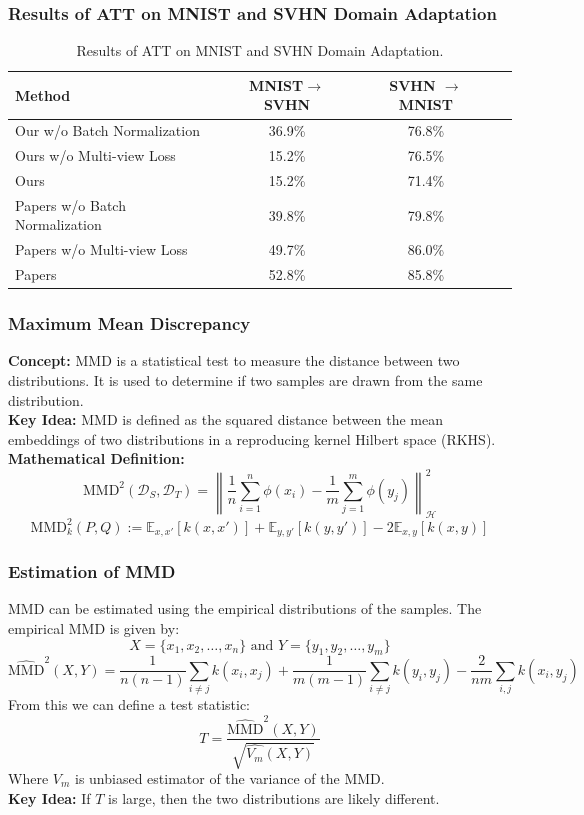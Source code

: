 \documentclass{beamer}
\begin{document}
\begin{frame}
    \frametitle{Results of ATT on MNIST and SVHN Domain Adaptation}

    \begin{table}[h]
        \centering
        \caption{Results of ATT on MNIST and SVHN Domain Adaptation.}
        \label{tab:att_results}
        \begin{tabular}{lccc}
            \toprule
            \textbf{Method} & \textbf{MNIST\(\to\)SVHN} & \textbf{SVHN \(\to\) MNIST} \\
            \midrule
            Our w/o Batch Normalization & 36.9\% & 76.8\% \\
            Ours w/o Multi-view Loss & 15.2\% & 76.5\% \\
            Ours  & 15.2\% & 71.4\% \\
            \midrule
            Papers w/o Batch Normalization & 39.8\% & 79.8\% \\
            Papers w/o Multi-view Loss & 49.7\% & 86.0\% \\
            Papers  & 52.8\% & 85.8\% \\
            \bottomrule
        \end{tabular}
      \end{table}
\end{frame}


\begin{frame}
    \frametitle{Maximum Mean Discrepancy}
    \textbf{Concept:} MMD is a statistical test to measure the distance between two distributions. It is used to determine if two samples are drawn from the same distribution.\\
    \textbf{Key Idea:} MMD is defined as the squared distance between the mean embeddings of two distributions in a reproducing kernel Hilbert space (RKHS).\\
    \textbf{Mathematical Definition:}
    \[
        \text{MMD}^2(\mathcal{D}_S, \mathcal{D}_T) = \left\| \frac{1}{n} \sum_{i=1}^{n} \phi(x_i) - \frac{1}{m} \sum_{j=1}^{m} \phi(y_j) \right\|_{\mathcal{H}}^2
    \]
    \[
        \text{MMD}^2_k(P,Q) := \mathbb{E}_{x,x'}[k(x,x')] + \mathbb{E}_{y,y'}[k(y,y')] - 2\mathbb{E}_{x,y}[k(x,y)]
    \]   
\end{frame}

\begin{frame}
    \frametitle{Estimation of MMD}
    MMD can be estimated using the empirical distributions of the samples. The empirical MMD is given by:
    \[
         X = \{x_1, x_2, \ldots, x_n\} \text{ and } Y = \{y_1, y_2, \ldots, y_m\}
    \]
    \small \[
        \hat{\text{MMD}}^2(X,Y) = \frac{1}{n(n-1)} \sum_{i \neq j} k(x_i, x_j) + \frac{1}{m(m-1)} \sum_{i \neq j} k(y_i, y_j) - \frac{2}{nm} \sum_{i,j} k(x_i, y_j)
    \]
    From this we can define a test statistic:
    \[
        T = \frac{\hat{\text{MMD}}^2(X,Y)}{\sqrt{\hat{V_m}(X,Y)}}
    \]
    Where \(V_m\) is unbiased estimator of the variance of the MMD.\\
    \textbf{Key Idea:} If \(T\) is large, then the two distributions are likely different.\\

\end{frame}
\end{document}
